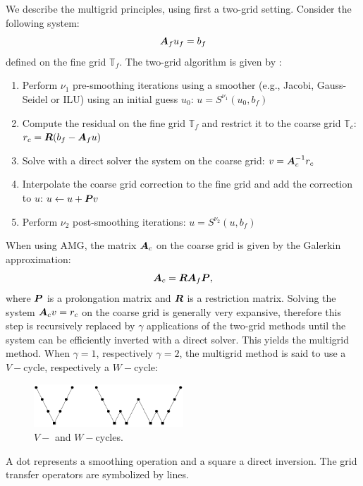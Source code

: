 We describe the multigrid principles, using first a two-grid setting. Consider
the following system:
\begin{equation}
  \boldsymbol{A}_f u_f = b_f
\end{equation}
defined on the fine grid $\mathbb{T}_f$.  The two-grid algorithm is given by :
\begin{enumerate}
  \item Perform $\nu_1$ pre-smoothing iterations using a smoother (e.g., Jacobi,
    Gauss-Seidel or ILU) using an initial guess $u_0$: $u = S^{\nu_1}(u_0,b_f)$
  \item Compute the residual on the fine grid $\mathbb{T}_f$ and restrict it to
    the coarse grid $\mathbb{T}_c$: $r_c = \boldsymbol{R}(b_f-\boldsymbol{A}_f u)$
  \item Solve with a direct solver the system on the coarse grid: 
    $v=\boldsymbol{A}_c^{-1} r_c$
  \item Interpolate the coarse grid correction to the fine grid and add the
    correction to $u$: $u \leftarrow u+\boldsymbol{P}v$
  \item Perform $\nu_2$ post-smoothing iterations: $u = S^{\nu_2}(u,b_f)$
\end{enumerate}
When using AMG, the matrix $\boldsymbol{A}_c$ on the coarse grid is given by the Galerkin
approximation:
\begin{equation}
  \boldsymbol{A}_c = \boldsymbol{R}\boldsymbol{A}_f \boldsymbol{P},
\end{equation}
where $\boldsymbol{P}$ is a prolongation matrix and $\boldsymbol{R}$ is a restriction matrix.
Solving the system $\boldsymbol{A}_c v = r_c$ on the coarse grid is generally very
expansive, therefore this step is recursively replaced by $\gamma$
applications of the  two-grid
methods until the system can be efficiently inverted with a direct solver.
This yields the multigrid method. When $\gamma = 1$, respectively $\gamma =
2$, the multigrid method is said to use a $V-$cycle, respectively a $W-$cycle:
\begin{figure}[H]
  \centering
  \includegraphics[width=0.5\textwidth]{./Dsa/v_w_cycles}
  \caption{$V-$ and $W-$cycles.}
\end{figure}
A dot represents a smoothing operation and a square a direct inversion. The grid 
transfer operators are symbolized by lines.

